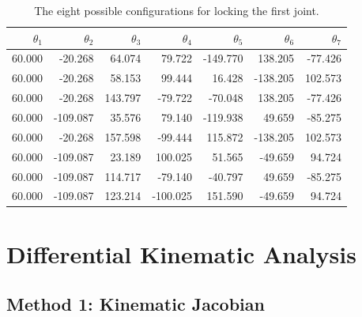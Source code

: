 \documentclass{article}
\begin{document}
\begin{table}[h]
\centering
\begin{tabular}{*{7}{r}}
\toprule
$\theta_1$ & $\theta_2$ & $\theta_3$ & $\theta_4$ & $\theta_5$ & $\theta_6$ & $\theta_7$ \\
\midrule
60.000 &  -20.268   &  64.074 &   79.722 & -149.770 &  138.205 & -77.426 \\
60.000 &  -20.268   &  58.153 &   99.444 &   16.428 & -138.205 & 102.573 \\
60.000 &  -20.268   & 143.797 &  -79.722 &  -70.048 &  138.205 & -77.426 \\
60.000 & -109.087   &  35.576 &   79.140 & -119.938 &   49.659 & -85.275 \\
60.000 &  -20.268   & 157.598 &  -99.444 &  115.872 & -138.205 & 102.573 \\
60.000 & -109.087   &  23.189 &  100.025 &   51.565 &  -49.659 &  94.724 \\
60.000 & -109.087   & 114.717 &  -79.140 &  -40.797 &   49.659 & -85.275 \\
60.000 & -109.087   & 123.214 & -100.025 &  151.590 &  -49.659 &  94.724 \\
\bottomrule
\end{tabular}
\caption{The eight possible configurations for locking the first joint.}
\end{table}

\section{Differential Kinematic Analysis}
\subsection{Method 1: Kinematic Jacobian}
\end{document}
